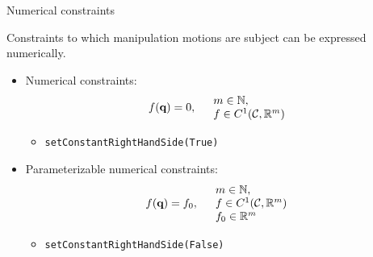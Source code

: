 %
%
\begin {frame} {Numerical constraints}

Constraints to which manipulation motions are subject can be expressed numerically.
\begin{itemize}
\item Numerical constraints:
  $$f (\textbf{q}) = 0,\ \ \ \begin{array}{l}m\in\mathbb{N},\\ f\in C^1({\cal C},\mathbb{R}^m)\end{array} $$
  \begin{itemize}
    \item \texttt{\scriptsize setConstantRightHandSide(True)}
  \end{itemize}
\item Parameterizable numerical constraints:
  $$f (\conf) = f_0,\ \ \ \begin{array}{l}m\in\entiernaturel,\\ f\in C^1(\CS,\real^m) \\ f_0\in\real^m\end{array} $$
  \begin{itemize}
    \item \texttt{\scriptsize setConstantRightHandSide(False)}
  \end{itemize}
\end{itemize}

\end{frame}

%
%


